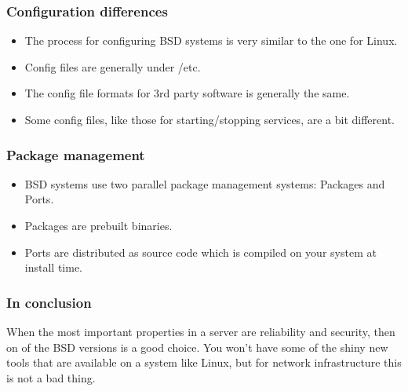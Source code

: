 \documentclass[10pt]{beamer}
\begin{document}
\begin{frame}
  \frametitle{Configuration differences}
  \begin{itemize}
    \item The process for configuring BSD systems is very similar
          to the one for Linux.
    \item Config files are generally under /etc.
    \item The config file formats for 3rd party software is generally the same.
    \item Some config files, like those for starting/stopping services, are
          a bit different.
  \end{itemize}  
\end{frame}



\begin{frame}
  \frametitle{Package management}
  \begin{itemize}
    \item BSD systems use two parallel package management systems: Packages and Ports.
    \item Packages are prebuilt binaries.
    \item Ports are distributed as source code which is compiled on your
          system at install time.
  \end{itemize}  
\end{frame}

\begin{frame}
  \frametitle{In conclusion}

   When the most important properties in a server are reliability and
   security, then on of the BSD versions is a good choice.  You won't 
   have some of the shiny new tools that are available on a system like Linux,
   but for network infrastructure this is not a bad thing.
\end{frame}
\end{document}
